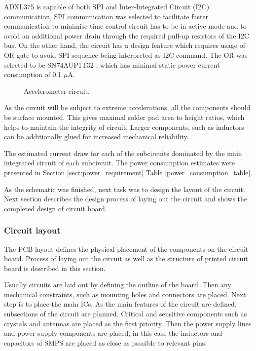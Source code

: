 ADXL375 is capable of both SPI and Inter-Integrated Circuit (I2C) communication, SPI communication was selected to facilitate faster communication to minimise time control circuit has to be in active mode and to avoid an additional power drain through the required pull-up resistors of the I2C bus. On the other hand, the circuit has a design feature which requires usage of OR gate to avoid SPI sequence being interpreted as I2C command. The OR was selected to be SN74AUP1T32 \cite{orgate}, which has minimal static power current consumption of 0.1 $\mu$A. 

\begin{figure}[htb]
    \centering
    \def\svgwidth{\columnwidth}
    
    \caption{\label{fig:sensor_circuit} Accelerometer circuit.}
\end{figure}

As the circuit will be subject to extreme accelerations, all the components should be surface mounted. This gives maximal solder pad area to height ratios, which helps to maintain the integrity of circuit. Larger components, such as inductors can be additionally glued for increased mechanical reliability.

The estimated current draw for each of the subcircuits dominated by the main integrated circuit of each subcircuit. The power consumption estimates were presented in Section \ref{sect:power_requirement} Table \ref{power_consumption_table}.

As the schematic was finished, next task was to design the layout of the circuit. Next section describes the design process of laying out the circuit and shows the completed design of circuit board.

\subsubsection{Circuit layout}
The PCB layout defines the physical placement of the components on the circuit board. Process of laying out the circuit as well as the structure of printed circuit board is described in this section.

Usually circuits are laid out by defining the outline of the board. Then any mechanical constraints, such as mounting holes and connectors are placed. Next step is to place the main ICs. As the main features of the circuit are defined, subsections of the circuit are planned. Critical and sensitive components such as crystals and antennas are placed as the first priority. Then the power supply lines and power supply components are placed, in this case the inductors and capacitors of SMPS are placed as close as possible to relevant pins. 

